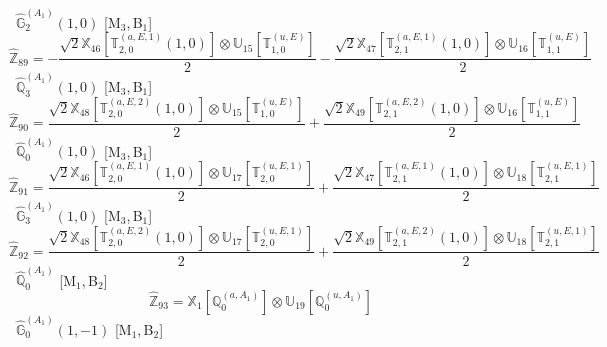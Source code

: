\documentclass[fleqn,10pt,landscape]{article}
\begin{document}
\begin{itemize}
\vspace{4mm}
\noindent {} $\,\,\,\hat{\mathbb{G}}_{2}^{(A_{1})}(1,0)$ [M$_{3}$,\,B$_{1}$]
\begin{dmath*}
\hat{\mathbb{Z}}_{89}=- \frac{\sqrt{2} \mathbb{X}_{46}[\mathbb{T}_{2,0}^{(a,E,1)}(1,0)] \otimes\mathbb{U}_{15}[\mathbb{T}_{1,0}^{(u,E)}]}{2} - \frac{\sqrt{2} \mathbb{X}_{47}[\mathbb{T}_{2,1}^{(a,E,1)}(1,0)] \otimes\mathbb{U}_{16}[\mathbb{T}_{1,1}^{(u,E)}]}{2}
\end{dmath*}
\vspace{4mm}
\noindent {} $\,\,\,\hat{\mathbb{Q}}_{3}^{(A_{1})}(1,0)$ [M$_{3}$,\,B$_{1}$]
\begin{dmath*}
\hat{\mathbb{Z}}_{90}=\frac{\sqrt{2} \mathbb{X}_{48}[\mathbb{T}_{2,0}^{(a,E,2)}(1,0)] \otimes\mathbb{U}_{15}[\mathbb{T}_{1,0}^{(u,E)}]}{2} + \frac{\sqrt{2} \mathbb{X}_{49}[\mathbb{T}_{2,1}^{(a,E,2)}(1,0)] \otimes\mathbb{U}_{16}[\mathbb{T}_{1,1}^{(u,E)}]}{2}
\end{dmath*}
\vspace{4mm}
\noindent {} $\,\,\,\hat{\mathbb{Q}}_{0}^{(A_{1})}(1,0)$ [M$_{3}$,\,B$_{1}$]
\begin{dmath*}
\hat{\mathbb{Z}}_{91}=\frac{\sqrt{2} \mathbb{X}_{46}[\mathbb{T}_{2,0}^{(a,E,1)}(1,0)] \otimes\mathbb{U}_{17}[\mathbb{T}_{2,0}^{(u,E,1)}]}{2} + \frac{\sqrt{2} \mathbb{X}_{47}[\mathbb{T}_{2,1}^{(a,E,1)}(1,0)] \otimes\mathbb{U}_{18}[\mathbb{T}_{2,1}^{(u,E,1)}]}{2}
\end{dmath*}
\vspace{4mm}
\noindent {} $\,\,\,\hat{\mathbb{G}}_{3}^{(A_{1})}(1,0)$ [M$_{3}$,\,B$_{1}$]
\begin{dmath*}
\hat{\mathbb{Z}}_{92}=\frac{\sqrt{2} \mathbb{X}_{48}[\mathbb{T}_{2,0}^{(a,E,2)}(1,0)] \otimes\mathbb{U}_{17}[\mathbb{T}_{2,0}^{(u,E,1)}]}{2} + \frac{\sqrt{2} \mathbb{X}_{49}[\mathbb{T}_{2,1}^{(a,E,2)}(1,0)] \otimes\mathbb{U}_{18}[\mathbb{T}_{2,1}^{(u,E,1)}]}{2}
\end{dmath*}
\vspace{4mm}
\noindent {} $\,\,\,\hat{\mathbb{Q}}_{0}^{(A_{1})}$ [M$_{1}$,\,B$_{2}$]
\begin{dmath*}
\hat{\mathbb{Z}}_{93}=\mathbb{X}_{1}[\mathbb{Q}_{0}^{(a,A_{1})}] \otimes\mathbb{U}_{19}[\mathbb{Q}_{0}^{(u,A_{1})}]
\end{dmath*}
\vspace{4mm}
\noindent {} $\,\,\,\hat{\mathbb{G}}_{0}^{(A_{1})}(1,-1)$ [M$_{1}$,\,B$_{2}$]
\begin{dmath*}

\end{dmath*}
\end{itemize}
\end{document}
